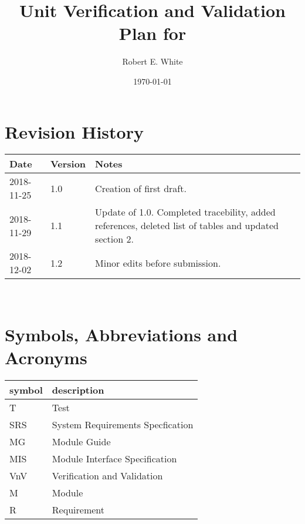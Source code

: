 \documentclass[12pt, titlepage]{article}
\begin{document}
\title{Unit Verification and Validation Plan for \progname{}} 
\author{Robert E. White}
\date{\today}
	
\maketitle


\section{Revision History}

\begin{tabularx}{\textwidth}{p{3cm}p{2cm}X}
\toprule {\bf Date} & {\bf Version} & {\bf Notes}\\
\midrule
2018-11-25 & 1.0 & Creation of first draft.\\
2018-11-29 & 1.1 & Update of 1.0. Completed tracebility, added references, 
deleted list of tables and updated section 2. \\ 
2018-12-02 & 1.2& Minor edits before submission. \\
\bottomrule
\end{tabularx}

~\newpage

\tableofcontents

\listoftables


\listoffigures


\newpage

\section{Symbols, Abbreviations and Acronyms}

\renewcommand{\arraystretch}{1.2}
\begin{tabular}{l l} 
  \toprule		
  \textbf{symbol} & \textbf{description}\\
  \midrule 
  T & Test\\ 
  SRS & System Requirements Specfication\\ 
  MG & Module Guide\\ 
  MIS & Module Interface Specification\\ 
  VnV & Verification and Validation\\ 
  M & Module\\ 
  R & Requirement\\
  \bottomrule
\end{tabular}\\
\end{document}
